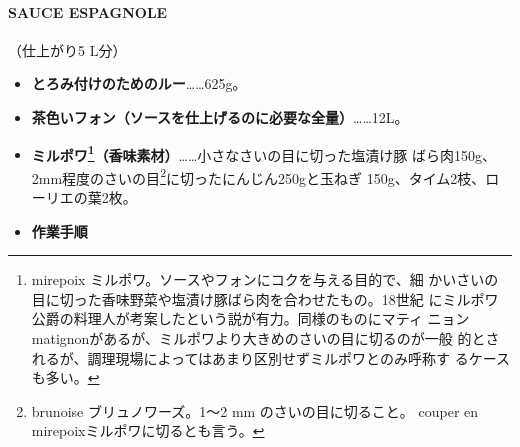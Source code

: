 \begin{recette}
\hypertarget{sauce-espagnole}{%
\paragraph{SAUCE ESPAGNOLE}\label{sauce-espagnole}}


（仕上がり5 L分）

\begin{itemize}
\item
  \textbf{とろみ付けのためのルー}\ldots{}\ldots{}625g。
\item
  \textbf{茶色いフォン（ソースを仕上げるのに必要な全量）}\ldots{}\ldots{}12L。
\item
  \textbf{ミルポワ\footnote{mirepoix
    ミルポワ。ソースやフォンにコクを与える目的で、細
    かいさいの目に切った香味野菜や塩漬け豚ばら肉を合わせたもの。18世紀
    にミルポワ公爵の料理人が考案したという説が有力。同様のものにマティ
    ニョンmatignonがあるが、ミルポワより大きめのさいの目に切るのが一般
    的とされるが、調理現場によってはあまり区別せずミルポワとのみ呼称す
    るケースも多い。}（香味素材）}\ldots{}\ldots{}小さなさいの目に切った塩漬け豚
  ばら肉150g、2mm程度のさいの目\footnote{brunoise ブリュノワーズ。1〜2
    mm のさいの目に切ること。 couper en mirepoixミルポワに切るとも言う。}に切ったにんじん250gと玉ねぎ
  150g、タイム2枝、ローリエの葉2枚。\hypertarget{mirepoix}{}
  \label{mirepoix}
\item
  \textbf{作業手順}
\end{itemize}


\end{recette}
